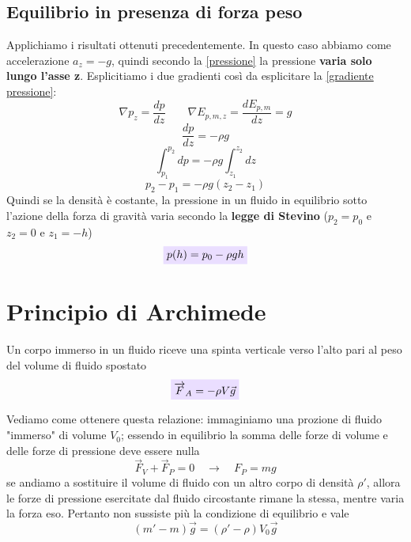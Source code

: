 \documentclass[x11names]{report}
\newcommand{\viola}[1]{\colorbox{yred}{$\displaystyle #1$}}
\begin{document}
	\subsection{Equilibrio in presenza di forza peso}
	Applichiamo i risultati ottenuti precedentemente. In questo caso abbiamo come accelerazione \(a_z = -g\), quindi secondo la \ref{pressione} la pressione \textbf{varia solo lungo l'asse z}. Esplicitiamo i due gradienti così da esplicitare la \ref{gradiente pressione}:
	\[ 
	\boxed{\nabla p_z = \frac{d p}{d z} }\qquad \boxed{\nabla E_{p,m,z} = \frac{d E_{p,m}}{d z} = g}
	\]
	\[ 
	\frac{dp}{dz} = -\rho g
	\]
	\[ 
	\int_{p_1}^{p_2}dp = -\rho g \int_{z_1}^{z_2}dz
	\]
	\[ 
	p_2 - p_1 = -\rho g (z_2 - z_1)
	\]
	Quindi se la densità è costante, la pressione in un fluido in equilibrio sotto l'azione della forza di gravità varia secondo la \textbf{legge di Stevino }(\(p_2 = p_0\) e \(z_2 = 0\) e \(z_1 = -h\))
	\begin{equation}\label{stevino}
		\viola{ p(h) = p_0 -\rho g h}
	\end{equation}
	
	\section{Principio di Archimede}
	Un corpo immerso in un fluido riceve una spinta verticale verso l'alto  pari al peso del volume di fluido spostato
	\begin{equation}
		\viola{	\overrightarrow{F}_A = -\rho V \vec{g}}
	\end{equation}
	
	
	
	Vediamo come ottenere questa relazione: immaginiamo una prozione di fluido "immerso" di volume \(V_{0}\); essendo in equilibrio la somma delle forze di volume e delle forze di pressione deve essere nulla
	\[ 
	\overrightarrow{F}_{V} + \overrightarrow{F}_{P} = 0 \quad \to \quad F_{P} = mg
	\]
	se andiamo a sostituire il volume di fluido con un altro corpo di densità \(\rho'\), allora le forze di pressione esercitate dal fluido circostante rimane la stessa, mentre varia la forza eso. Pertanto non sussiste più la condizione di equilibrio e vale
	\[ 
	(m' - m)\vec{g} = (\rho'-\rho)V_{0}\vec{g}
	\]
	
\end{document}
